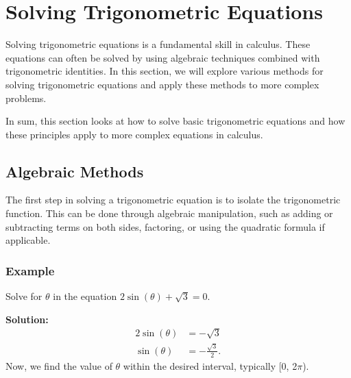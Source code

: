 \documentclass[a4paper,12pt]{book}
\newcounter{problem}
\begin{document}



\section{Solving Trigonometric Equations}
\label{sec:solving_trig_equations}

Solving trigonometric equations is a fundamental skill in calculus. These equations can often be solved by using algebraic techniques combined with trigonometric identities. In this section, we will explore various methods for solving trigonometric equations and apply these methods to more complex problems.

In sum, this section looks at how to solve basic trigonometric equations and how these principles apply to more complex equations in calculus.

\subsection{Algebraic Methods}
\label{subsec:algebraic_methods}
The first step in solving a trigonometric equation is to isolate the trigonometric function. This can be done through algebraic manipulation, such as adding or subtracting terms on both sides, factoring, or using the quadratic formula if applicable.

\subsubsection{Example}
Solve for \(\theta\) in the equation \(2\sin(\theta) + \sqrt{3} = 0\).

\textbf{Solution:}
\begin{align*}
2\sin(\theta) &= -\sqrt{3} \\
\sin(\theta) &= -\frac{\sqrt{3}}{2}.
\end{align*}
Now, we find the value of \(\theta\) within the desired interval, typically [0, 2\(\pi\)).
\end{document}
